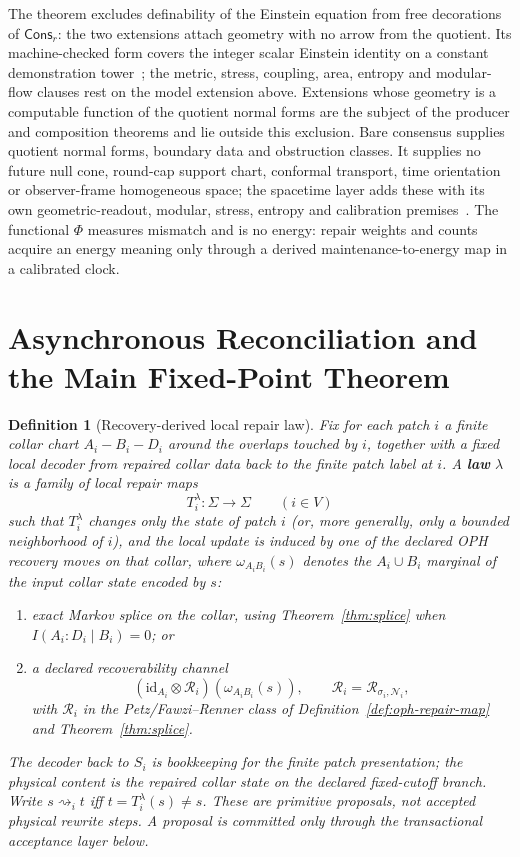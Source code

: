 \documentclass[11pt]{article}
\newtheorem{definition}[theorem]{Definition}
\theoremstyle{remark}
\theoremstyle{plain}
\begin{document}
The theorem excludes definability of the Einstein equation from free
decorations of \(\mathsf{Cons}_r\): the two extensions attach geometry with
no arrow from the quotient. Its machine-checked form covers the integer
scalar Einstein identity on a constant demonstration
tower~\cite{ophrepo}; the metric, stress, coupling, area, entropy and
modular-flow clauses rest on the model extension above. Extensions whose
geometry is a computable function of the quotient normal forms are the
subject of the producer and composition theorems and lie outside this
exclusion. Bare consensus supplies quotient normal forms, boundary data and
obstruction classes. It supplies no future null cone, round-cap support
chart, conformal transport, time orientation or observer-frame homogeneous
space; the spacetime layer adds these with its own geometric-readout,
modular, stress, entropy and calibration premises~\cite{ophEinstein}.
The functional \(\Phi\) measures mismatch and is no energy: repair weights
and counts acquire an energy meaning only through a derived
maintenance-to-energy map in a calibrated clock.


\section{Asynchronous Reconciliation and the Main Fixed-Point Theorem}

\begin{definition}[Recovery-derived local repair law]\label{def:repair}
Fix for each patch \(i\) a finite collar chart \(A_i\!-\!B_i\!-\!D_i\) around the overlaps touched
by \(i\), together with a fixed local decoder from repaired collar data back to the finite patch
label at \(i\). A \textbf{law} \(\lambda\) is a family of local repair maps
\[
T_i^\lambda:\Sigma\to\Sigma
\qquad (i\in V)
\]
such that \(T_i^\lambda\) changes only the state of patch \(i\) (or, more generally, only a
bounded neighborhood of \(i\)), and the local update is induced by one of the declared OPH
recovery moves on that collar, where \(\omega_{A_iB_i}(s)\) denotes the \(A_i\cup B_i\) marginal
of the input collar state encoded by \(s\):
\begin{enumerate}[label=(\roman*),leftmargin=2em]
\item exact Markov splice on the collar, using Theorem~\ref{thm:splice} when
      \(I(A_i:D_i\mid B_i)=0\); or
\item a declared recoverability channel
\[
(\mathrm{id}_{A_i}\otimes \mathcal R_i)(\omega_{A_iB_i}(s)),
\qquad
\mathcal R_i=\mathcal R_{\sigma_i,\mathcal N_i},
\]
      with \(\mathcal R_i\) in the Petz/Fawzi--Renner class of
      Definition~\ref{def:oph-repair-map} and Theorem~\ref{thm:splice}.
\end{enumerate}
The decoder back to \(S_i\) is bookkeeping for the finite patch presentation; the physical content
is the repaired collar state on the declared fixed-cutoff branch. Write
\(s\rightsquigarrow_i t\) iff \(t=T_i^\lambda(s)\neq s\). These are primitive proposals, not
accepted physical rewrite steps. A proposal is committed only through the transactional acceptance
layer below.
\end{definition}
\end{document}
